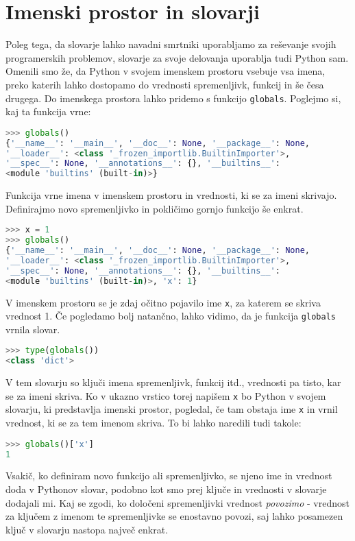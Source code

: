 \section{Imenski prostor in slovarji}
Poleg tega, da slovarje lahko navadni smrtniki uporabljamo za reševanje svojih programerskih problemov, slovarje za svoje delovanja uporablja tudi Python sam. Omenili smo že, da Python v svojem imenskem prostoru vsebuje vsa imena, preko katerih lahko dostopamo do vrednosti spremenljivk, funkcij in še česa drugega. Do imenskega prostora lahko pridemo s funkcijo \texttt{globals}. Poglejmo si, kaj ta funkcija vrne:
\begin{lstlisting}[language=Python, showstringspaces=false]
>>> globals()
{'__name__': '__main__', '__doc__': None, '__package__': None, 
'__loader__': <class '_frozen_importlib.BuiltinImporter'>, 
'__spec__': None, '__annotations__': {}, '__builtins__':
<module 'builtins' (built-in)>}
\end{lstlisting}
Funkcija vrne imena v imenskem prostoru in vrednosti, ki se za imeni skrivajo. Definirajmo novo spremenljivko in pokličimo gornjo funkcijo še enkrat.
\begin{lstlisting}[language=Python, showstringspaces=false]
>>> x = 1
>>> globals()
{'__name__': '__main__', '__doc__': None, '__package__': None, 
'__loader__': <class '_frozen_importlib.BuiltinImporter'>, 
'__spec__': None, '__annotations__': {}, '__builtins__':
<module 'builtins' (built-in)>, 'x': 1}
\end{lstlisting}
V imenskem prostoru se je zdaj očitno pojavilo ime \texttt{x}, za katerem se skriva vrednost 1. Če pogledamo bolj natančno, lahko vidimo, da je funkcija \texttt{globals} vrnila slovar.
\begin{lstlisting}[language=Python, showstringspaces=false]
>>> type(globals())
<class 'dict'>
\end{lstlisting}
V tem slovarju so ključi imena spremenljivk, funkcij itd., vrednosti pa tisto, kar se za imeni skriva. Ko v ukazno vrstico torej napišem \texttt{x} bo Python v svojem slovarju, ki predstavlja imenski prostor, pogledal, če tam obstaja ime \texttt{x} in vrnil vrednost, ki se za tem imenom skriva. To bi lahko naredili tudi takole:
\begin{lstlisting}[language=Python, showstringspaces=false]
>>> globals()['x']
1
\end{lstlisting}
Vsakič, ko definiram novo funkcijo ali spremenljivko, se njeno ime in vrednost doda v Pythonov slovar, podobno kot smo prej ključe in vrednosti v slovarje dodajali mi. Kaj se zgodi, ko določeni spremenljivki vrednost \emph{povozimo} - vrednost za ključem z imenom te spremenljivke se enostavno povozi, saj lahko posamezen ključ v slovarju nastopa največ enkrat.
